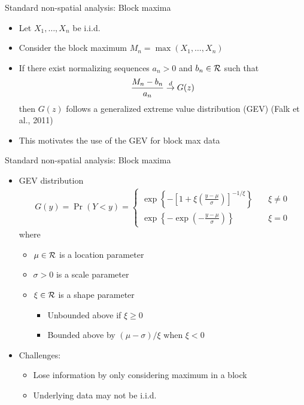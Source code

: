 \documentclass{beamer}
\begin{document}
\begin{frame}{Standard non-spatial analysis: Block maxima}
  \begin{itemize} \setlength{\itemsep}{1em}
    \item Let $X_1, \ldots, X_n$ be i.i.d.
    \item Consider the block maximum $M_n = \max(X_1, \ldots, X_n)$
    \item If there exist normalizing sequences $a_n > 0$ and $b_n \in {\cal R}$ such that
    \begin{align*}
      \frac{ M_n - b_n }{ a_n } \stackrel{d}{\rightarrow} G(z)
    \end{align*}
    then $G(z)$ follows a generalized extreme value distribution (GEV) (Falk et al., 2011)
    \item This motivates the use of the GEV for block max data
  \end{itemize}
\end{frame}

\begin{frame}{Standard non-spatial analysis: Block maxima}
  \begin{itemize} \setlength{\itemsep}{1em}
    \item GEV distribution
    \begin{align*}
      G(y) = \Pr(Y < y) = \left\{  \begin{array}{ll}
        \exp\left\{ -\left[ 1 + \xi \left( \frac{ y - \mu }{ \sigma } \right) \right]^{ -1 / \xi} \right\} & \quad \xi \neq 0 \\[0.5em]
        \exp \left\{ -\exp \left( - \frac{ y - \mu }{ \sigma} \right) \right\} & \quad \xi = 0
      \end{array}\right.
    \end{align*}
    where
    \begin{itemize}
      \item $\mu \in {\cal R}$ is a location parameter
      \item $\sigma > 0$ is a scale parameter
      \item $\xi \in {\cal R}$ is a shape parameter
      \begin{itemize}
        \item Unbounded above if $\xi \ge 0$
        \item Bounded above by $(\mu - \sigma) / \xi$ when $\xi < 0$
      \end{itemize}
    \end{itemize}
    \item Challenges:
    \begin{itemize}
      \item Lose information by only considering maximum in a block
      \item Underlying data may not be i.i.d.
    \end{itemize}
  \end{itemize}
\end{frame}
\end{document}
